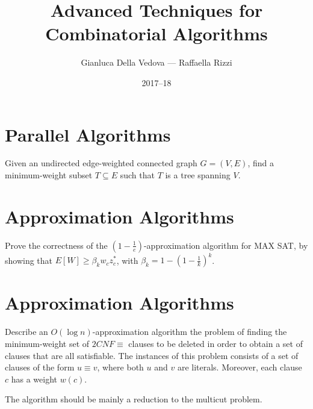 \documentclass[12pt]{article}
\begin{document}
\title{Advanced Techniques for Combinatorial Algorithms}
\author{Gianluca Della Vedova --- Raffaella Rizzi}
\date{2017--18}

\maketitle


\section{Parallel Algorithms}

Given an undirected edge-weighted connected graph $G = (V, E)$, find a minimum-weight
subset $T \subseteq E$ such that $T$ is a tree spanning $V$.




\section{Approximation Algorithms}

Prove the correctness of the  $\left(1 - \frac{1}{e} \right)$-approximation algorithm for
MAX SAT, by showing that       $E[W] \ge \beta_{k} w_{c}z_{c}^{*}$, with $\beta_{k}=1- \left(1- \frac{1}{k}\right)^{k}$.
%

\section{Approximation Algorithms}

Describe an $O(\log n)$-approximation algorithm the problem of finding the minimum-weight set of $2CNF\equiv$
clauses to be deleted in order to obtain a set of clauses that are all satisfiable.
%
The instances of this problem consists of a set of clauses of the form $u\equiv v$, where
both $u$ and $v$ are literals.
%
Moreover, each clause $c$ has a weight $w(c)$.
%

The algorithm should be mainly a reduction to the multicut problem.
%


\end{document}
